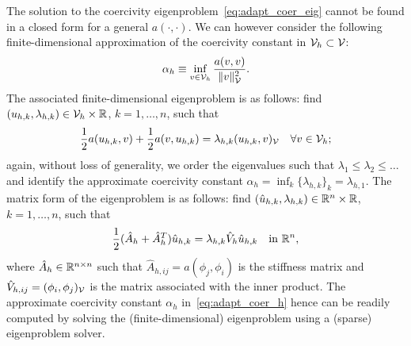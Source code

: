 The solution to the coercivity eigenproblem~\eqref{eq:adapt_coer_eig} cannot be found in a closed form for a general $a(\cdot,\cdot)$.  We can however consider the following finite-dimensional approximation of the coercivity constant in $\mathcal{V}_h \subset \mathcal{V}$:
\begin{equation}
  \label{eq:adapt_coer_h}
  \alpha_h \equiv \inf_{v \in \mathcal{V}_h} \frac{a(v,v)}{ \| v \|^2_{\mathcal{V}}}.
\end{equation}
The associated finite-dimensional eigenproblem is as follows: find $(u_{h,k},\lambda_{h,k}) \in \mathcal{V}_h \times \mathbb{R}$, $k = 1,\dots,n$, such that
\begin{equation*}
  \frac{1}{2} a(u_{h,k}, v) + \frac{1}{2} a(v, u_{h,k})
  = \lambda_{h,k} (u_{h,k},v)_{\mathcal{V}} \quad \forall v \in \mathcal{V}_h;
\end{equation*}
again, without loss of generality, we order the eigenvalues such that $\lambda_1 \leq \lambda_2 \leq \dots$ and identify the approximate coercivity constant $\alpha_h = \inf_k \{ \lambda_{h,k} \}_k = \lambda_{h,1}$.  The matrix form of the eigenproblem is as follows: find $(\hat u_{h,k}, \lambda_{h,k}) \in \mathbb{R}^n \times \mathbb{R}$, $k = 1,\dots,n$, such that
\begin{equation*}
  \frac{1}{2} ( \hat A_h  + \hat A_h^T )\hat u_{h,k}  = \lambda_{h,k} \hat V_h \hat u_{h,k} \quad \text{in } \mathbb{R}^n,
\end{equation*}
where $\hat A_h \in \mathbb{R}^{n \times n}$ such that $\hat A_{h,ij} = a(\phi_j,\phi_i)$ is the stiffness matrix and $\hat V_{h,ij} = (\phi_i,\phi_j)_{\mathcal{V}}$ is the matrix associated with the inner product.  The approximate coercivity constant $\alpha_h$ in~\eqref{eq:adapt_coer_h} hence can be readily computed by solving the (finite-dimensional) eigenproblem using a (sparse) eigenproblem solver.

